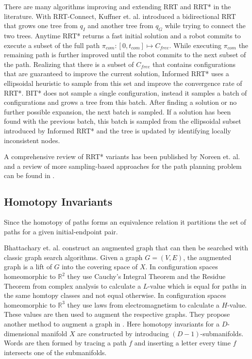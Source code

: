 \documentclass[]{article}
\begin{document}
There are many algorithms improving and extending RRT and RRT* in the
literature. With RRT-Connect, Kuffner et. al.
\cite{kuffnerRRTConnectEfficientApproach} introduced a bidirectional
RRT that grows one tree from \(q_I\) and another tree from \(q_G\)
while trying to connect the two trees. Anytime RRT*
\cite{karamanAnytimeMotionPlanning2011} returns a fast initial
solution and a robot commits to execute a subset of the full path
\(\pi_{com}: [0, t_{com}] \mapsto C_{free}\). While executing
\(\pi_{com}\) the remaining path is further improved until the robot
commits to the next subset of the path. Realizing that there is a
subset of \(C_{free}\) that contains configurations that are
guaranteed to improve the current solution, Informed RRT*
\cite{gammellInformedRRTOptimal2014} uses a ellipsoidal heuristic to
sample from this set and improve the convergence rate of RRT*. BIT*
\cite{gammellBatchInformedTrees2015} does not sample a single
configuration, instead it samples a batch of configurations and grows
a tree from this batch.  After finding a solution or no further
possible expansion, the next batch is sampled. If a solution has been
found with the previous batch, this batch is sampled from the
ellipsoidal subset introduced by Informed RRT* and the tree is updated
by identifying locally inconsistent nodes.

A comprehensive review of RRT* variants has been published by Noreen
et. al.  \cite{noreenOptimalPathPlanning2016a} and a review of more
sampling-based approaches for the path planning problem can be found
in \cite{elbanhawiSamplingBasedRobotMotion2014}.

\subsection*{Homotopy Invariants}
Since the homotopy of paths forms
an equivalence relation \cite{hatcherAlgebraicTopology2002} it
partitions the set of paths for a given initial-endpoint
pair.

Bhattachary
et. al. \cite{bhattacharyaSearchbasedPathPlanning2010,bhattacharyaSearchBasedPathPlanning2012}
construct an augmented graph that can then be searched with classic
graph search algorithms. Given a graph \(G = (V, E)\), the augmented
graph is a lift of \(G\) into the covering space of \(X\). In
configuration spaces homeomorphic to \(\mathbb{R}^{2}\) they use
Cauchy's Integral Theorem and the Residue Theorem from complex
analysis to calculate a \(L\)-value which is equal for paths in the
same homtopy classes and not equal otherwise. In configuration spaces
homeomorphic to \(\mathbb{R}^{3}\) they use laws from electromagnetism
to calculate a \(H\)-value. These values are then used to augment the
respective graphs.  They propose another method to augment a graph in
\cite{bhattacharyaPathHomotopyInvariants2018}.  Here homotopy
invariants for a \(D\)-dimensional manifold \(X\) are constructed by
introducing \((D - 1)\)-submanifolds. Words are then formed by tracing
a path \(f\) and inserting a letter every time \(f\) intersects one of
the submanifolds.
\end{document}
